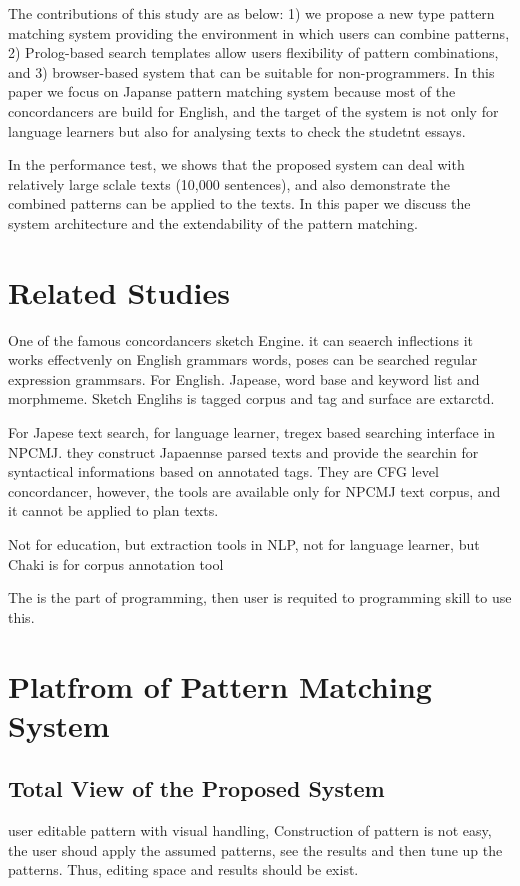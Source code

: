 \documentclass[conference]{IEEEtran}
\begin{document}
The contributions of this study are as below:
1) we propose a new type pattern matching system providing the environment in which users can
combine patterns, 
2) Prolog-based search templates allow users flexibility of pattern combinations, and 
3) browser-based system that can be suitable for non-programmers.
In this paper we focus on Japanse pattern matching system because 
most of the concordancers are build for English, and the target of the system is
not only for language learners but also for analysing texts to check the studetnt essays. 

In the performance test, we shows that the proposed system can deal with relatively large sclale texts
(10,000 sentences), and also demonstrate the combined patterns can be applied to the texts.
In this paper we discuss the system architecture and the extendability of the pattern matching. 

\section{Related Studies}

One of the famous concordancers sketch Engine.
it can seaerch inflections it works effectvenly on English grammars  words, poses can be searched
regular expression grammsars. For English. Japease, word base and keyword list and morphmeme.
Sketch Englihs is tagged corpus and tag and surface are extarctd.

For Japese text search, for language learner, tregex based searching interface in NPCMJ.
they construct Japaennse parsed texts and provide the searchin for syntactical informations
based on annotated tags. They are CFG level concordancer, however, the tools are available only for NPCMJ
text corpus, and it cannot be applied to plan texts.

Not for education, but extraction tools in NLP, 
not for language learner, but Chaki is for corpus annotation tool

The is the part of programming, then user is requited to programming skill to use this.


\section{Platfrom of Pattern Matching System}

\subsection{Total View of the Proposed System}
user editable pattern with visual handling, Construction of pattern is not easy, the
user shoud apply the assumed patterns, see the results and then tune up the patterns.
Thus, editing space and results should be exist.
\end{document}
